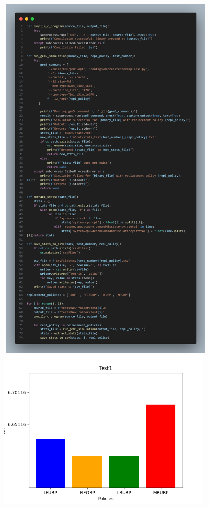 ‫‫‫‫‫‫‫‫‫‫‫‫‫‫‫‫‫‫‫‫‫‫‫‫‫‫‫‫‫‫‫‫‫‫‫‫‫‫‫‫‫\includegraphics[width=0.8\textwidth]{code.png}\newpage
‫\includegraphics[width=0.8\textwidth]{graph/csv1CPI.png}\\
